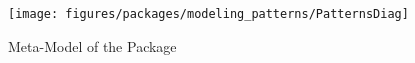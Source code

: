 %
%

\begin{figure}[htbp]
  \centering
  \texttt{[image: figures/packages/modeling\_patterns/PatternsDiag]}
  \caption{Meta-Model of the  Package}
  \label{fig:MM:patterns}
\end{figure}
